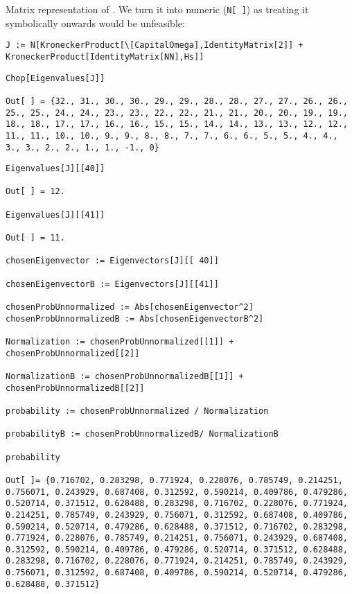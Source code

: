 Matrix representation of \cite[Eq. 1]{Lloyd:Time}.
We turn it into numeric (\verb!N[ ]!) as treating  it symbolically onwards would be unfeasible:
\begin{lstlisting}
J := N[KroneckerProduct[\[CapitalOmega],IdentityMatrix[2]] + KroneckerProduct[IdentityMatrix[NN],Hs]]
\end{lstlisting}
\begin{lstlisting}
Chop[Eigenvalues[J]]

Out[ ] = {32., 31., 30., 30., 29., 29., 28., 28., 27., 27., 26., 26., 25., 25., 24., 24., 23., 23., 22., 22., 21., 21., 20., 20., 19., 19., 18., 18., 17., 17., 16., 16., 15., 15., 14., 14., 13., 13., 12., 12., 11., 11., 10., 10., 9., 9., 8., 8., 7., 7., 6., 6., 5., 5., 4., 4., 3., 3., 2., 2., 1., 1., -1., 0}
\end{lstlisting}
\begin{lstlisting}
Eigenvalues[J][[40]]

Out[ ] = 12.

Eigenvalues[J][[41]]

Out[ ] = 11.

chosenEigenvector := Eigenvectors[J][[ 40]]

chosenEigenvectorB := Eigenvectors[J][[41]]

chosenProbUnnormalized := Abs[chosenEigenvector^2]
chosenProbUnnormalizedB := Abs[chosenEigenvectorB^2]

Normalization := chosenProbUnnormalized[[1]] + chosenProbUnnormalized[[2]]

NormalizationB := chosenProbUnnormalizedB[[1]] + chosenProbUnnormalizedB[[2]]

probability := chosenProbUnnormalized / Normalization

probabilityB := chosenProbUnnormalizedB/ NormalizationB

probability

Out[ ]= {0.716702, 0.283298, 0.771924, 0.228076, 0.785749, 0.214251, 0.756071, 0.243929, 0.687408, 0.312592, 0.590214, 0.409786, 0.479286, 0.520714, 0.371512, 0.628488, 0.283298, 0.716702, 0.228076, 0.771924, 0.214251, 0.785749, 0.243929, 0.756071, 0.312592, 0.687408, 0.409786, 0.590214, 0.520714, 0.479286, 0.628488, 0.371512, 0.716702, 0.283298, 0.771924, 0.228076, 0.785749, 0.214251, 0.756071, 0.243929, 0.687408, 0.312592, 0.590214, 0.409786, 0.479286, 0.520714, 0.371512, 0.628488, 0.283298, 0.716702, 0.228076, 0.771924, 0.214251, 0.785749, 0.243929, 0.756071, 0.312592, 0.687408, 0.409786, 0.590214, 0.520714, 0.479286, 0.628488, 0.371512}


\end{lstlisting}
